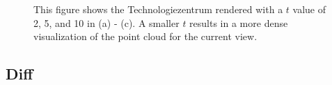 \begin{figure}
    \centering
    \par\medskip
    \par\medskip        
    \caption[Different $t$ values for Technologiezentrum]
		{This figure shows the Technologiezentrum rendered with a $t$ value of 2, 5, and 10 in (a) - (c). A smaller $t$ results in a more dense visualization of the point cloud for the current view. }
    \label{fig:targetpointDistance}
\end{figure}


\subsection{Diff}

